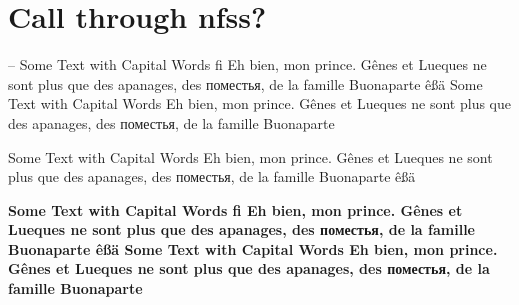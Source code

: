 \documentclass[parskip=half-]{scrartcl}
\begin{document}
\section{Call through nfss?}


\normalsize 
{}\selectfont -- 
Some Text with Capital Words fi
Eh bien, mon prince. Gênes et Lueques ne sont plus que des
apanages, des поместья, de la famille Buonaparte êßä
%
\large
Some Text with Capital Words
Eh bien, mon prince. Gênes et Lueques ne sont plus que des
apanages, des поместья, de la famille Buonaparte

\normalsize

Some Text with Capital Words
Eh bien, mon prince. Gênes et Lueques ne sont plus que des
apanages, des поместья, de la famille Buonaparte êßä

\bfseries 
\normalsize
{}\selectfont
Some Text with Capital Words fi
Eh bien, mon prince. Gênes et Lueques ne sont plus que des
apanages, des поместья, de la famille Buonaparte êßä
%
\large
Some Text with Capital Words
Eh bien, mon prince. Gênes et Lueques ne sont plus que des
apanages, des поместья, de la famille Buonaparte
\end{document}
